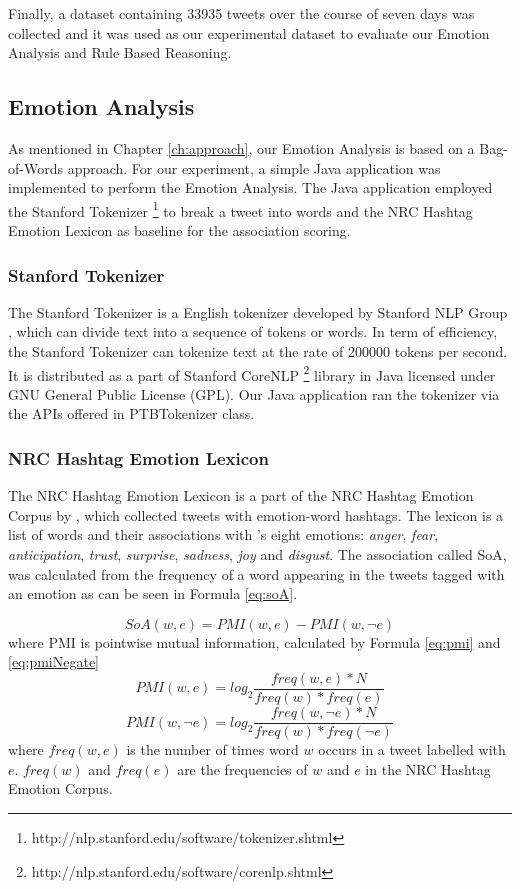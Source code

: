 Finally, a dataset containing 33935 tweets over the course of seven days was collected and it was used as our experimental dataset to evaluate our Emotion Analysis and Rule Based Reasoning.

\subsection{Emotion Analysis}
As mentioned in Chapter \ref{ch:approach}, our Emotion Analysis is based on a Bag-of-Words approach. For our experiment, a simple Java application was implemented to perform the Emotion Analysis. The Java application employed the Stanford Tokenizer \footnote{http://nlp.stanford.edu/software/tokenizer.shtml} to break a tweet into words and the NRC Hashtag Emotion Lexicon \parencite{mohammad2014using} as baseline for the association scoring.

\subsubsection{Stanford Tokenizer}
The Stanford Tokenizer is a English tokenizer developed by Stanford NLP Group \parencite{manning-EtAl:2014:P14-5}, which can divide text into a sequence of tokens or words. In term of efficiency, the Stanford Tokenizer can tokenize text at the rate of 200000 tokens per second. It is distributed as a part of Stanford CoreNLP \footnote{http://nlp.stanford.edu/software/corenlp.shtml} library in Java licensed under GNU General Public License (GPL). Our Java application ran the tokenizer via the APIs offered in PTBTokenizer class.

\subsubsection{NRC Hashtag Emotion Lexicon}
The NRC Hashtag Emotion Lexicon is a part of the NRC Hashtag Emotion Corpus by \textcite{mohammad2014using}, which collected tweets with emotion-word hashtags. The lexicon is a list of words and their associations with \parencite{plutchik2001nature}'s eight emotions: \textit{anger}, \textit{fear}, \textit{anticipation}, \textit{trust}, \textit{surprise}, \textit{sadness}, \textit{joy} and \textit{disgust}. The association called SoA, was calculated from the frequency of a word appearing in the tweets tagged with an emotion as can be seen in Formula \ref{eq:soA}.

\begin{equation}
\label{eq:soA}
	SoA(w, e) = PMI(w, e) - PMI(w, \neg{e})
\end{equation}
where PMI is pointwise mutual information, calculated by Formula \ref{eq:pmi} and \ref{eq:pmiNegate}
\begin{equation}
\label{eq:pmi}
	PMI(w, e) = log_2\frac{freq(w, e) * N}{freq(w) * freq(e)}
\end{equation}
\begin{equation}
\label{eq:pmiNegate}
	PMI(w, \neg{e}) = log_2\frac{freq(w, \neg{e}) * N}{freq(w) * freq(\neg{e})}	
\end{equation}
where \(freq(w,e)\) is the number of times word \(w\) occurs in a tweet labelled with \(e\). \(freq(w)\) and \(freq(e)\) are the frequencies of \(w\) and \(e\) in the NRC Hashtag Emotion Corpus.

